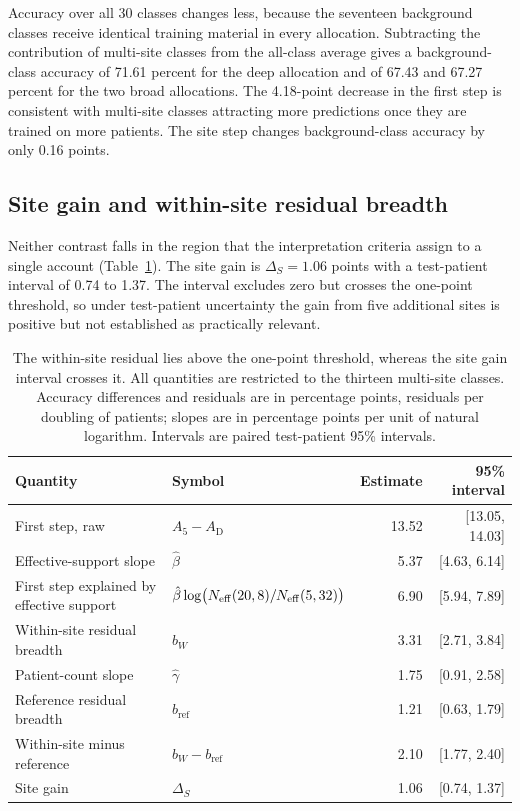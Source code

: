 \noindent Accuracy over all 30 classes changes less, because the seventeen background classes receive identical training material in every allocation. Subtracting the contribution of multi-site classes from the all-class average gives a background-class accuracy of 71.61 percent for the deep allocation and of 67.43 and 67.27 percent for the two broad allocations. The 4.18-point decrease in the first step is consistent with multi-site classes attracting more predictions once they are trained on more patients. The site step changes background-class accuracy by only 0.16 points.

\subsection{Site gain and within-site residual breadth}
Neither contrast falls in the region that the interpretation criteria assign to a single account (Table~\ref{tab:contrasts}). The site gain is $\Delta_S=1.06$ points with a test-patient interval of 0.74 to 1.37. The interval excludes zero but crosses the one-point threshold, so under test-patient uncertainty the gain from five additional sites is positive but not established as practically relevant.

\begin{table}[htbp]
\centering
\small
\renewcommand{\arraystretch}{1.15}
\begin{tabular}{@{}llrr@{}}
\toprule
Quantity & Symbol & Estimate & 95\% interval \\
\midrule
First step, raw & $A_5-A_{\mathrm D}$ & 13.52 & [13.05, 14.03] \\
Effective-support slope & $\hat\beta$ & 5.37 & [4.63, 6.14] \\
First step explained by effective support & $\hat\beta\log\bigl(N_{\mathrm{eff}}(20,8)/N_{\mathrm{eff}}(5,32)\bigr)$ & 6.90 & [5.94, 7.89] \\
Within-site residual breadth & $b_W$ & 3.31 & [2.71, 3.84] \\
\midrule
Patient-count slope & $\hat\gamma$ & 1.75 & [0.91, 2.58] \\
Reference residual breadth & $b_{\mathrm{ref}}$ & 1.21 & [0.63, 1.79] \\
Within-site minus reference & $b_W-b_{\mathrm{ref}}$ & 2.10 & [1.77, 2.40] \\
\midrule
Site gain & $\Delta_S$ & 1.06 & [0.74, 1.37] \\
\bottomrule
\end{tabular}
\caption{The within-site residual lies above the one-point threshold, whereas the site gain interval crosses it. All quantities are restricted to the thirteen multi-site classes. Accuracy differences and residuals are in percentage points, residuals per doubling of patients; slopes are in percentage points per unit of natural logarithm. Intervals are paired test-patient 95\% intervals.}
\label{tab:contrasts}
\end{table}

